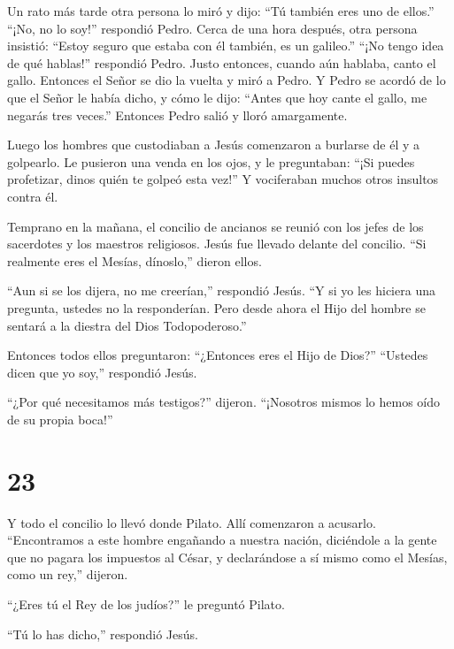  Un rato más tarde otra persona lo miró y dijo: ``Tú
también eres uno de ellos.'' ``¡No, no lo soy!'' respondió Pedro.
 Cerca de una hora después, otra persona insistió: ``Estoy
seguro que estaba con él también, es un galileo.''  ``¡No
tengo idea de qué hablas!'' respondió Pedro. Justo entonces, cuando aún
hablaba, canto el gallo. Entonces el Señor se dio la vuelta y miró a
Pedro.  Y Pedro se acordó de lo que el Señor le había
dicho, y cómo le dijo: ``Antes que hoy cante el gallo, me negarás tres
veces.''  Entonces Pedro salió y lloró amargamente.

 Luego los hombres que custodiaban a Jesús comenzaron a
burlarse de él y a golpearlo.  Le pusieron una venda en los
ojos, y le preguntaban: ``¡Si puedes profetizar, dinos quién te golpeó
esta vez!''  Y vociferaban muchos otros insultos contra él.

 Temprano en la mañana, el concilio de ancianos se reunió
con los jefes de los sacerdotes y los maestros religiosos. Jesús fue
llevado delante del concilio.  ``Si realmente eres el
Mesías, dínoslo,'' dieron ellos.

``Aun si se los dijera, no me creerían,'' respondió Jesús. 
``Y si yo les hiciera una pregunta, ustedes no la responderían.
 Pero desde ahora el Hijo del hombre se sentará a la
diestra del Dios Todopoderoso.''

 Entonces todos ellos preguntaron: ``¿Entonces eres el Hijo
de Dios?'' ``Ustedes dicen que yo soy,'' respondió Jesús.

 ``¿Por qué necesitamos más testigos?'' dijeron.
``¡Nosotros mismos lo hemos oído de su propia boca!''

\hypertarget{section-22}{%
\section{23}\label{section-22}}

 Y todo el concilio lo llevó donde Pilato.  Allí
comenzaron a acusarlo. ``Encontramos a este hombre engañando a nuestra
nación, diciéndole a la gente que no pagara los impuestos al César, y
declarándose a sí mismo como el Mesías, como un rey,'' dijeron.

 ``¿Eres tú el Rey de los judíos?'' le preguntó Pilato.

``Tú lo has dicho,'' respondió Jesús.

